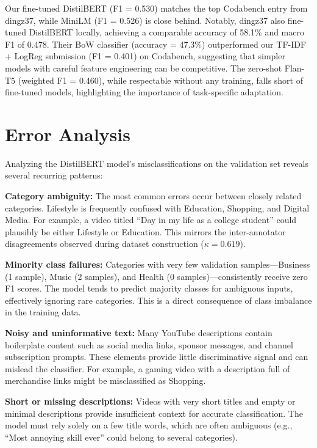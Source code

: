 \documentclass[11pt]{article}
\begin{document}
Our fine-tuned DistilBERT (F1 = 0.530) matches the top Codabench entry from dingz37, while MiniLM (F1 = 0.526) is close behind. Notably, dingz37 also fine-tuned DistilBERT locally, achieving a comparable accuracy of 58.1\% and macro F1 of 0.478. Their BoW classifier (accuracy = 47.3\%) outperformed our TF-IDF + LogReg submission (F1 = 0.401) on Codabench, suggesting that simpler models with careful feature engineering can be competitive. The zero-shot Flan-T5 (weighted F1 = 0.460), while respectable without any training, falls short of fine-tuned models, highlighting the importance of task-specific adaptation.

\section{Error Analysis}

Analyzing the DistilBERT model's misclassifications on the validation set reveals several recurring patterns:

\textbf{Category ambiguity:} The most common errors occur between closely related categories. Lifestyle is frequently confused with Education, Shopping, and Digital Media. For example, a video titled ``Day in my life as a college student'' could plausibly be either Lifestyle or Education. This mirrors the inter-annotator disagreements observed during dataset construction ($\kappa = 0.619$).

\textbf{Minority class failures:} Categories with very few validation samples---Business (1 sample), Music (2 samples), and Health (0 samples)---consistently receive zero F1 scores. The model tends to predict majority classes for ambiguous inputs, effectively ignoring rare categories. This is a direct consequence of class imbalance in the training data.

\textbf{Noisy and uninformative text:} Many YouTube descriptions contain boilerplate content such as social media links, sponsor messages, and channel subscription prompts. These elements provide little discriminative signal and can mislead the classifier. For example, a gaming video with a description full of merchandise links might be misclassified as Shopping.

\textbf{Short or missing descriptions:} Videos with very short titles and empty or minimal descriptions provide insufficient context for accurate classification. The model must rely solely on a few title words, which are often ambiguous (e.g., ``Most annoying skill ever'' could belong to several categories).
\end{document}
